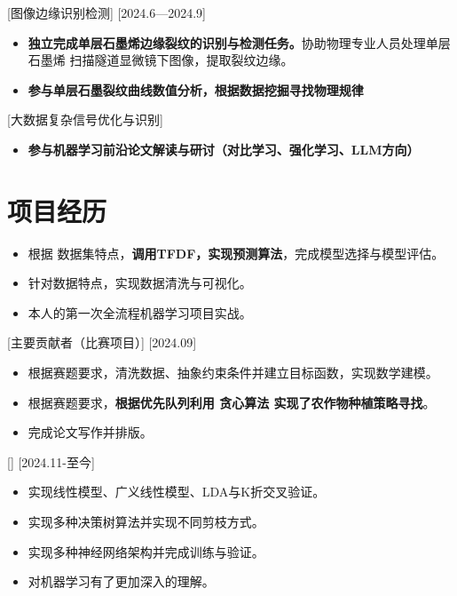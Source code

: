 \documentclass{resume}
\begin{document}
[图像边缘识别检测]
[2024.6—2024.9] 

\begin{itemize}
  \item \textbf{独立完成单层石墨烯边缘裂纹的识别与检测任务。}协助物理专业人员处理单层石墨烯
  扫描隧道显微镜下图像，提取裂纹边缘。
  \item \textbf{参与单层石墨裂纹曲线数值分析，根据数据挖掘寻找物理规律}
\end{itemize}

[大数据复杂信号优化与识别]
\begin{itemize}
  \item \textbf{参与机器学习前沿论文解读与研讨（对比学习、强化学习、LLM方向）}
\end{itemize}

\section{项目经历}


\begin{itemize}
  \item 根据 数据集特点，\textbf{调用TFDF，实现预测算法}，完成模型选择与模型评估。
  \item 针对数据特点，实现数据清洗与可视化。
  \item 本人的第一次全流程机器学习项目实战。
\end{itemize}

[主要贡献者（比赛项目）]
[2024.09]

\begin{itemize}
  \item 根据赛题要求，清洗数据、抽象约束条件并建立目标函数，实现数学建模。
  \item 根据赛题要求，\textbf{根据优先队列利用 贪心算法 实现了农作物种植策略寻找}。
  \item 完成论文写作并排版。
\end{itemize}

[]
[2024.11-至今]
\begin{itemize}
  \item 实现线性模型、广义线性模型、LDA与K折交叉验证。
  \item 实现多种决策树算法并实现不同剪枝方式。
  \item 实现多种神经网络架构并完成训练与验证。
  \item 对机器学习有了更加深入的理解。
\end{itemize}
\end{document}
